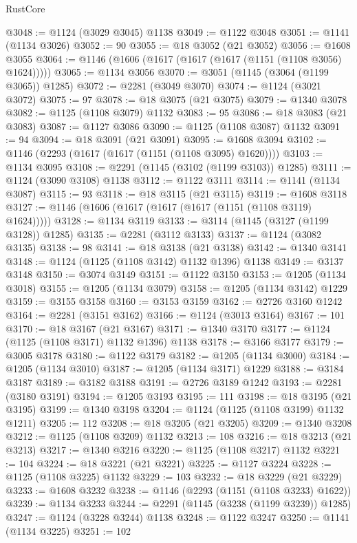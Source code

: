 \begin{lexlean}{RustCore}
\begin{coremodule}
@3048 := @1124 (@3029 @3045) @1138
@3049 := @1122 @3048
@3051 := @1141 (@1134 @3026)
@3052 := 90
@3055 := @18 @3052 (@21 @3052)
@3056 := @1608 @3055
@3064 := @1146 (@1606 (@1617 (@1617 (@1617 (@1151 (@1108 @3056) @1624)))))
@3065 := @1134 @3056
@3070 := @3051 (@1145 (@3064 (@1199 @3065)) @1285)
@3072 := @2281 (@3049 @3070)
@3074 := @1124 (@3021 @3072)
@3075 := 97
@3078 := @18 @3075 (@21 @3075)
@3079 := @1340 @3078
@3082 := @1125 (@1108 @3079) @1132
@3083 := 95
@3086 := @18 @3083 (@21 @3083)
@3087 := @1127 @3086
@3090 := @1125 (@1108 @3087) @1132
@3091 := 94
@3094 := @18 @3091 (@21 @3091)
@3095 := @1608 @3094
@3102 := @1146 (@2293 (@1617 (@1617 (@1151 (@1108 @3095) @1620))))
@3103 := @1134 @3095
@3108 := @2291 (@1145 (@3102 (@1199 @3103)) @1285)
@3111 := @1124 (@3090 @3108) @1138
@3112 := @1122 @3111
@3114 := @1141 (@1134 @3087)
@3115 := 93
@3118 := @18 @3115 (@21 @3115)
@3119 := @1608 @3118
@3127 := @1146 (@1606 (@1617 (@1617 (@1617 (@1151 (@1108 @3119) @1624)))))
@3128 := @1134 @3119
@3133 := @3114 (@1145 (@3127 (@1199 @3128)) @1285)
@3135 := @2281 (@3112 @3133)
@3137 := @1124 (@3082 @3135)
@3138 := 98
@3141 := @18 @3138 (@21 @3138)
@3142 := @1340 @3141
@3148 := @1124 (@1125 (@1108 @3142) @1132 @1396) @1138
@3149 := @3137 @3148
@3150 := @3074 @3149
@3151 := @1122 @3150
@3153 := @1205 (@1134 @3018)
@3155 := @1205 (@1134 @3079)
@3158 := @1205 (@1134 @3142) @1229
@3159 := @3155 @3158
@3160 := @3153 @3159
@3162 := @2726 @3160 @1242
@3164 := @2281 (@3151 @3162)
@3166 := @1124 (@3013 @3164)
@3167 := 101
@3170 := @18 @3167 (@21 @3167)
@3171 := @1340 @3170
@3177 := @1124 (@1125 (@1108 @3171) @1132 @1396) @1138
@3178 := @3166 @3177
@3179 := @3005 @3178
@3180 := @1122 @3179
@3182 := @1205 (@1134 @3000)
@3184 := @1205 (@1134 @3010)
@3187 := @1205 (@1134 @3171) @1229
@3188 := @3184 @3187
@3189 := @3182 @3188
@3191 := @2726 @3189 @1242
@3193 := @2281 (@3180 @3191)
@3194 := @1205 @3193
@3195 := 111
@3198 := @18 @3195 (@21 @3195)
@3199 := @1340 @3198
@3204 := @1124 (@1125 (@1108 @3199) @1132 @1211)
@3205 := 112
@3208 := @18 @3205 (@21 @3205)
@3209 := @1340 @3208
@3212 := @1125 (@1108 @3209) @1132
@3213 := 108
@3216 := @18 @3213 (@21 @3213)
@3217 := @1340 @3216
@3220 := @1125 (@1108 @3217) @1132
@3221 := 104
@3224 := @18 @3221 (@21 @3221)
@3225 := @1127 @3224
@3228 := @1125 (@1108 @3225) @1132
@3229 := 103
@3232 := @18 @3229 (@21 @3229)
@3233 := @1608 @3232
@3238 := @1146 (@2293 (@1151 (@1108 @3233) @1622))
@3239 := @1134 @3233
@3244 := @2291 (@1145 (@3238 (@1199 @3239)) @1285)
@3247 := @1124 (@3228 @3244) @1138
@3248 := @1122 @3247
@3250 := @1141 (@1134 @3225)
@3251 := 102

\end{coremodule}
\end{lexlean}
